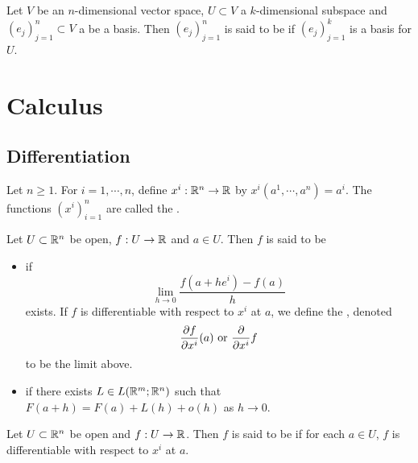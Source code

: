 \documentclass{book}
\begin{document}
	\begin{defn}  
		Let $V$ be an $n$-dimensional vector space, $U \subset V$ a $k$-dimensional subspace and $(e_j)_{j=1}^n \subset V$ a be a basis. Then $(e_j)_{j=1}^n$ is said to be  if $(e_j)_{j=1}^k$ is a basis for $U$.
	\end{defn}








	
	\newpage
	\section{Calculus}
	
	\subsection{Differentiation}
	
	
	\begin{defn} 
		Let $n \geq 1$. For $i = 1, \cdots, n$, define $x^i: \mathbb{R}^n \rightarrow \mathbb{R}$ by $x^i(a^1, \cdots, a^n) = a^i$. The functions $(x^i)_{i=1}^n$ are called the . 
	\end{defn}
	
	\begin{defn} 
		Let $U \subset \mathbb{R}^n$ be open, $f: U \rightarrow \mathbb{R}$ and $a \in U$. Then $f$ is said to be 
		\begin{itemize}
			\item {} if $$\lim\limits_{h \rightarrow 0} \frac{f(a + he^i) - f(a)}{h}$$ exists. If $f$ is differentiable with respect to $x^i$ at $a$, we define the , denoted $$\frac{\partial f}{\partial x^i} (a) \text{ or } \frac{\partial}{\partial x^i} f $$ to be the limit above.
			\item {} if there exists $L \in L(\mathbb{R}^m; \mathbb{R}^n)$ such that $F(a + h) = F(a) + L(h) + o(h)$ as $h \rightarrow 0$.
		\end{itemize}
	\end{defn}
		
	\begin{defn} 
		Let $U \subset \mathbb{R}^n$ be open and $f: U \rightarrow \mathbb{R}$. Then $f$ is said to be  if for each $a \in U$, $f$ is differentiable with respect to $x^i$ at $a$.
	\end{defn}
\end{document}
